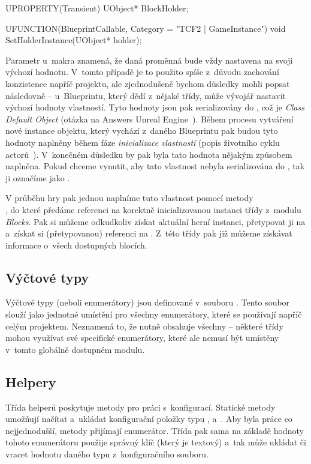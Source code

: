 \begin{code}
	UPROPERTY(Transient)
		UObject* BlockHolder;

	UFUNCTION(BlueprintCallable, Category = "TCF2 | GameInstance")
		void SetHolderInstance(UObject* holder);
\end{code}



 Parametr  u~makra  znamená, že daná proměnná bude vždy nastavena na svoji výchozí hodnotu. V~tomto případě je to použito spíše z~důvodu zachování konzistence napříč projektu, ale zjednodušeně bychom důsledky mohli popsat následovně -- u~Blueprintu, který dědí z~nějaké \CPP{} třídy, může vývojář nastavit výchozí hodnoty vlastností. Tyto hodnoty jsou pak serializovány do \CDO{}, což je \textit{Class Default Object} (otázka na Answers Unreal Engine~\citep{ue_cdo}). Během procesu vytváření nové instance objektu, který vychází z~daného Blueprintu pak budou tyto hodnoty naplněny během fáze \textit{inicializace vlastností} (popis životního cyklu actorů~\citep{ue_actor_life}). V~konečném důsledku by pak byla tato hodnota nějakým způsobem naplněna. Pokud chceme vynutit, aby tato vlastnost nebyla serializována do \CDO{}, tak ji označíme jako .

V průběhu hry pak jednou naplníme tuto vlastnost pomocí metody\\ , do které předáme referenci na korektně inicializovanou instanci třídy  z~modulu \textit{Blocks}. Pak si můžeme odkudkoliv získat aktuální herní instanci, přetypovat ji na  a~získat si (přetypovanou) referenci na . Z~této třídy pak již můžeme získávat informace o~všech dostupných blocích.

\subsection{Výčtové typy}

Výčtové typy (neboli enumerátory) jsou definované v~souboru . Tento soubor slouží jako jednotné umístění pro všechny enumerátory, které se používají napříč celým projektem. Neznamená to, že nutně obsahuje všechny -- některé třídy mohou využívat své specifické enumerátory, které ale nemusí být umístěny v~tomto globálně dostupném modulu.


\subsection{Helpery}

Třída helperů  poskytuje metody pro práci s~konfigurací. Statické metody umožňují načítat a~ukládat konfigurační položky typu ,  a~.
Aby byla práce co nejjednodušší, metody přijímají enumerátor\linebreak[4]. Třída pak sama na základě hodnoty tohoto enumerátoru použije správný klíč (který je textový) a~tak může ukládat či vracet hodnotu daného typu z~konfiguračního souboru.